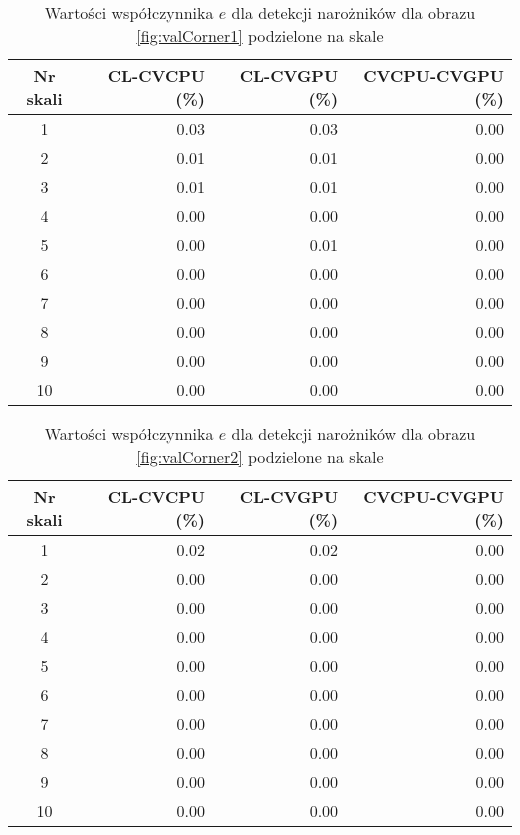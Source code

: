 \begin{center}
\begin{table}
\centering
\centering
\caption{Wartości współczynnika $ e $ dla detekcji narożników dla obrazu \ref{fig:valCorner1} podzielone na skale}
\label{tab:imageScaleCorner1}
\begin{tabular}{|c|r|r|r|}
 \hline
Nr skali & CL-CVCPU (\%) & CL-CVGPU (\%) & CVCPU-CVGPU (\%) \\ \hline
1        & 0.03     & 0.03     & 0.00        \\ \hline
2        & 0.01     & 0.01     & 0.00        \\ \hline
3        & 0.01     & 0.01     & 0.00        \\ \hline
4        & 0.00     & 0.00     & 0.00        \\ \hline
5        & 0.00     & 0.01     & 0.00        \\ \hline
6        & 0.00     & 0.00     & 0.00        \\ \hline
7        & 0.00     & 0.00     & 0.00        \\ \hline
8        & 0.00     & 0.00     & 0.00        \\ \hline
9        & 0.00     & 0.00     & 0.00        \\ \hline
10       & 0.00     & 0.00     & 0.00        \\ \hline
\end{tabular}
\end{table}
\end{center}

\begin{center}
\begin{table}
\centering
\centering
\caption{Wartości współczynnika $ e $ dla detekcji narożników dla obrazu \ref{fig:valCorner2} podzielone na skale}
\label{tab:imageScaleCorner2}
\begin{tabular}{|c|r|r|r|}
 \hline
Nr skali & CL-CVCPU (\%) & CL-CVGPU (\%) & CVCPU-CVGPU (\%) \\ \hline
1        & 0.02     & 0.02     & 0.00        \\ \hline
2        & 0.00     & 0.00     & 0.00        \\ \hline
3        & 0.00     & 0.00     & 0.00        \\ \hline
4        & 0.00     & 0.00     & 0.00        \\ \hline
5        & 0.00     & 0.00     & 0.00        \\ \hline
6        & 0.00     & 0.00     & 0.00        \\ \hline
7        & 0.00     & 0.00     & 0.00        \\ \hline
8        & 0.00     & 0.00     & 0.00        \\ \hline
9        & 0.00     & 0.00     & 0.00        \\ \hline
10       & 0.00     & 0.00     & 0.00        \\ \hline
\end{tabular}
\end{table}
\end{center}

